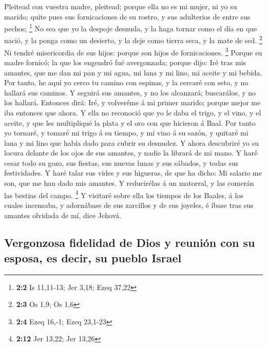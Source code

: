  Pleitead con vuestra madre, pleitead; porque ella no es
mi mujer, ni yo su marido; quite pues sus fornicaciones de su rostro, y
sus adulterios de entre sus pechos; \footnote{\textbf{2:2} Is 11,11-13;
  Jer 3,18; Ezeq 37,22}  No sea que yo la despoje desnuda,
y la haga tornar como el día en que nació, y la ponga como un desierto,
y la deje como tierra seca, y la mate de sed. \footnote{\textbf{2:3} Os
  1,9; Os 1,6}  Ni tendré misericordia de sus hijos:
porque son hijos de fornicaciones. \footnote{\textbf{2:4} Ezeq 16,-1;
  Ezeq 23,1-23}  Porque su madre fornicó; la que los
engendró fué avergonzada; porque dijo: Iré tras mis amantes, que me dan
mi pan y mi agua, mi lana y mi lino, mi aceite y mi bebida.
 Por tanto, he aquí yo cerco tu camino con espinas, y la
cercaré con seto, y no hallará sus caminos.  Y seguirá sus
amantes, y no los alcanzará; buscarálos, y no los hallará. Entonces
dirá: Iré, y volveréme á mi primer marido; porque mejor me iba entonces
que ahora.  Y ella no reconoció que yo le daba el trigo, y
el vino, y el aceite, y que les multipliqué la plata y el oro con que
hicieron á Baal.  Por tanto yo tornaré, y tomaré mi trigo
á su tiempo, y mi vino á su sazón, y quitaré mi lana y mi lino que había
dado para cubrir su desnudez.  Y ahora descubriré yo su
locura delante de los ojos de sus amantes, y nadie la librará de mi
mano.  Y haré cesar todo su gozo, sus fiestas, sus nuevas
lunas y sus sábados, y todas sus festividades.  Y haré
talar sus vides y sus higueras, de que ha dicho: Mi salario me son, que
me han dado mis amantes. Y reducirélas á un matorral, y las comerán las
bestias del campo. \footnote{\textbf{2:12} Jer 13,22; Jer 13,26}
 Y visitaré sobre ella los tiempos de los Baales, á los
cuales incensaba, y adornábase de sus zarcillos y de sus joyeles, é
íbase tras sus amantes olvidada de mí, dice Jehová.

\hypertarget{vergonzosa-fidelidad-de-dios-y-reuniuxf3n-con-su-esposa-es-decir-su-pueblo-israel}{%
\subsection{Vergonzosa fidelidad de Dios y reunión con su esposa, es
decir, su pueblo
Israel}\label{vergonzosa-fidelidad-de-dios-y-reuniuxf3n-con-su-esposa-es-decir-su-pueblo-israel}}

